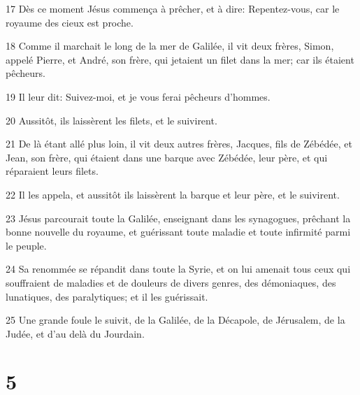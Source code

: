 \par 17 Dès ce moment Jésus commença à prêcher, et à dire: Repentez-vous, car le royaume des cieux est proche.
\par 18 Comme il marchait le long de la mer de Galilée, il vit deux frères, Simon, appelé Pierre, et André, son frère, qui jetaient un filet dans la mer; car ils étaient pêcheurs.
\par 19 Il leur dit: Suivez-moi, et je vous ferai pêcheurs d'hommes.
\par 20 Aussitôt, ils laissèrent les filets, et le suivirent.
\par 21 De là étant allé plus loin, il vit deux autres frères, Jacques, fils de Zébédée, et Jean, son frère, qui étaient dans une barque avec Zébédée, leur père, et qui réparaient leurs filets.
\par 22 Il les appela, et aussitôt ils laissèrent la barque et leur père, et le suivirent.
\par 23 Jésus parcourait toute la Galilée, enseignant dans les synagogues, prêchant la bonne nouvelle du royaume, et guérissant toute maladie et toute infirmité parmi le peuple.
\par 24 Sa renommée se répandit dans toute la Syrie, et on lui amenait tous ceux qui souffraient de maladies et de douleurs de divers genres, des démoniaques, des lunatiques, des paralytiques; et il les guérissait.
\par 25 Une grande foule le suivit, de la Galilée, de la Décapole, de Jérusalem, de la Judée, et d'au delà du Jourdain.

\chapter{5}

